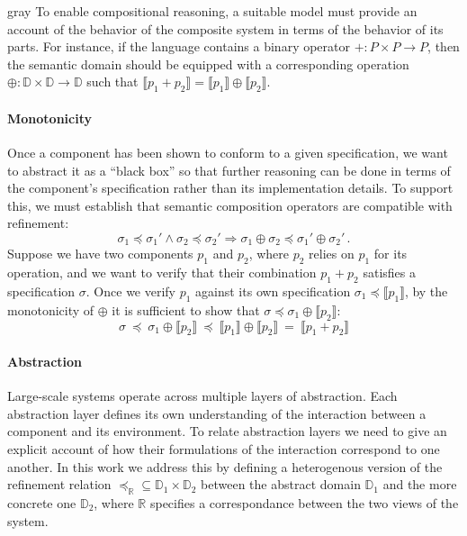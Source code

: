 \documentclass[acmsmall,screen,review,anonymous]{acmart}
\newcommand{\refby}{\preceq}
\newenvironment{optional}{\begin{color}{gray}}{\end{color}}
\begin{document}
\begin{optional}
To enable compositional reasoning,
a suitable model must provide an account of
the behavior of the composite system
in terms of the behavior of its parts.
For instance,
if the language contains a binary operator
${+} : P \times P \rightarrow P$,
then the semantic domain should be equipped with
a corresponding operation
${\oplus} : \mathbb{D} \times \mathbb{D} \rightarrow \mathbb{D}$
such that
$\llbracket p_1 + p_2 \rrbracket =
 \llbracket p_1 \rrbracket \oplus \llbracket p_2 \rrbracket$.


\paragraph{Monotonicity} %

Once a component has been shown to conform to a given specification,
we want to abstract it as a ``black box''
so that further reasoning can be done in terms of
the component's specification rather than its implementation details.
To support this,
we must establish that semantic composition operators
are compatible with refinement:
\[ \sigma_1 \refby \sigma_1' \wedge
   \sigma_2 \refby \sigma_2' \Rightarrow
   \sigma_1 \oplus \sigma_2 \refby \sigma_1' \oplus \sigma_2' \,. \]
Suppose we have two components $p_1$ and $p_2$,
where $p_2$ relies on $p_1$ for its operation,
and we want to verify that their combination $p_1 + p_2$
satisfies a specification $\sigma$.
Once we verify $p_1$ against its own specification
$\sigma_1 \refby \llbracket p_1 \rrbracket$,
by the monotonicity of ${\oplus}$ it is sufficient to show that
$\sigma \refby \sigma_1 \oplus \llbracket p_2 \rrbracket$:
\[
   \sigma \:\refby\:
   \sigma_1 \oplus \llbracket p_2 \rrbracket \:\refby\:
   \llbracket p_1 \rrbracket \oplus \llbracket p_2 \rrbracket \:=\:
   \llbracket p_1 + p_2 \rrbracket
\]


\paragraph{Abstraction} %

Large-scale systems operate across multiple layers of abstraction.
Each abstraction layer defines its own understanding of the interaction
between a component and its environment.
To relate abstraction layers we need to give
an explicit account of how their formulations of the interaction
correspond to one another.
In this work we address this by defining a heterogenous version
of the refinement relation
${\refby_\mathbb{R}} \subseteq
 \mathbb{D}_1 \times \mathbb{D}_2$ between
the abstract domain $\mathbb{D}_1$ and
the more concrete one $\mathbb{D}_2$, where
$\mathbb{R}$ specifies a correspondance between
the two views of the system.


\end{optional}
\end{document}
